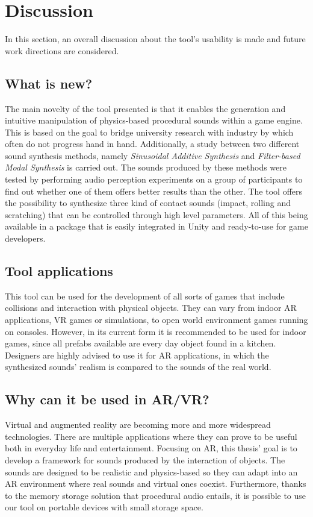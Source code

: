 \section{Discussion}
In this section, an overall discussion about the tool's usability is made and future work directions are considered.

\subsection{What is new?}
The main novelty of the tool presented is that it enables the generation and intuitive manipulation of physics-based procedural sounds within a game engine. This is based on the goal to bridge university research with industry by which often do not progress hand in hand.
Additionally, a study between two different sound synthesis methods, namely \textit{Sinusoidal Additive Synthesis} and \textit{Filter-based Modal Synthesis} is carried out. The sounds produced by these methods were tested by performing audio perception experiments on a group of participants to find out whether one of them offers better results than the other.
The tool offers the possibility to synthesize three kind of contact sounds (impact, rolling and scratching) that can be controlled through high level parameters. All of this being available in a package that is easily integrated in Unity\textsuperscript{\textregistered} and ready-to-use for game developers. 

\subsection{Tool applications}
This tool can be used for the development of all sorts of games that include collisions and interaction with physical objects. They can vary from indoor \gls{AR} applications, \gls{VR} games or simulations, to open world environment games running on consoles. However, in its current form it is recommended to be used for indoor games, since all prefabs available are every day object found in a kitchen. Designers are highly advised to use it for \gls{AR} applications, in which the synthesized sounds' realism is compared to the sounds of the real world.

\subsection{Why can it be used in AR/VR?}
Virtual and augmented reality are becoming more and more widespread technologies. There are multiple applications where they can prove to be useful both in everyday life and entertainment. Focusing on \gls{AR}, this thesis' goal is to develop a framework for sounds produced by the interaction of objects. The sounds are designed to be realistic and physics-based so they can adapt into an \gls{AR} environment where real sounds and virtual ones coexist. Furthermore, thanks to the memory storage solution that procedural audio entails, it is possible to use our tool on portable devices with small storage space.

